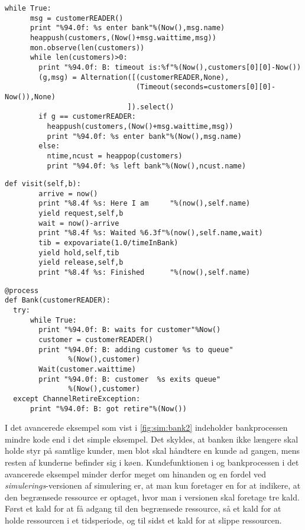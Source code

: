 \begin{lstlisting}[firstnumber=39,float=hbtp, label=fig:sim:bank, caption= Uddrag af bank processen i simulation]
    while True:
      msg = customerREADER()
      print "%94.0f: %s enter bank"%(Now(),msg.name)
      heappush(customers,(Now()+msg.waittime,msg))
      mon.observe(len(customers))
      while len(customers)>0:
        print "%94.0f: B: timeout is:%f"%(Now(),customers[0][0]-Now())
        (g,msg) = Alternation([(customerREADER,None),
                               (Timeout(seconds=customers[0][0]- Now()),None)
                             ]).select()
        if g == customerREADER:
          heappush(customers,(Now()+msg.waittime,msg))
          print "%94.0f: %s enter bank"%(Now(),msg.name)
        else:
          ntime,ncust = heappop(customers)
          print "%94.0f: %s left bank"%(Now(),ncust.name) 
\end{lstlisting}
\begin{lstlisting}[firstnumber=20 ,float=hbtp, label=fig:simpy:customer, caption=Funktionen \code{visit} i \simpy]
     def visit(self,b):                                
        arrive = now()
        print "%8.4f %s: Here I am     "%(now(),self.name)
        yield request,self,b                          
        wait = now()-arrive
        print "%8.4f %s: Waited %6.3f"%(now(),self.name,wait)
        tib = expovariate(1.0/timeInBank)            
        yield hold,self,tib                          
        yield release,self,b                         
        print "%8.4f %s: Finished      "%(now(),self.name)
\end{lstlisting}
\begin{lstlisting}[firstnumber=33 ,float=hbtp, label=fig:sim:bank2, caption=Bankprocessen\, hvor banken er en begrænset ressource. ]
  @process
def Bank(customerREADER):
  try:
      while True:
        print "%94.0f: B: waits for customer"%Now()
        customer = customerREADER()
        print "%94.0f: B: adding customer %s to queue"
               %(Now(),customer)
        Wait(customer.waittime)
        print "%94.0f: B: customer  %s exits queue"
               %(Now(),customer)
  except ChannelRetireException:
      print "%94.0f: B: got retire"%(Now())

\end{lstlisting}
I det avancerede eksempel som vist i  \cref{fig:sim:bank2} indeholder bankprocessen mindre kode end i det simple eksempel. Det skyldes, at banken ikke længere skal holde styr på samtlige kunder, men blot skal håndtere en kunde ad gangen, mens resten af kunderne befinder sig i køen. Kundefunktionen i \simpy og bankprocessen i det avancerede eksempel minder derfor meget om hinanden og en fordel ved \emph{simulerings}-versionen af simulering er, at man kun foretager en  for at indikere, at den begrænsede ressource er optaget, hvor man i \simpy versionen skal foretage tre kald. Først et kald for at få adgang til den begrænsede ressource, så et kald for at holde ressourcen i et tidsperiode, og til sidst et kald for at slippe ressourcen.
